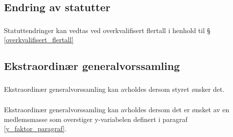 \documentclass{article}
\newenvironment{statute}[1][]
    {
        \titleformat{\subsubsection}[runin]{\normalfont}{\hspace{1pt}\textit{\S\hspace{5pt}\thesubsubsection}}{0pt}{\rule{4pt}{0pt}}{}
        \subsubsection{}#1
        \begin{minipage}[t]{0.89\linewidth}
    }
    {
        \end{minipage}
        
        \ignorespacesafterend
    }
\begin{document}
        \subsection{Endring av statutter}
            \begin{statute}
                Statuttendringer kan vedtas ved overkvalifisert flertall i henhold til \S\hspace{3pt}  \ref{overkvalifisert_flertall}
            \end{statute}
            
        \subsection{Ekstraordinær generalvorssamling}
            \begin{statute}
                Ekstraordinær generalvorssamling kan avholdes dersom styret ønsker det.
            \end{statute}
            \begin{statute}
                Ekstraordinær generalvorssamling kan avholdes dersom det er ønsket av en medlemsmasse som overstiger y-variabelen definert i paragraf \ref{y_faktor_paragraf}.
            \end{statute}
\end{document}
